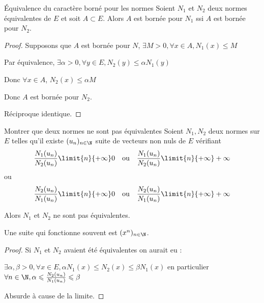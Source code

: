 \begin{proposition}{Équivalence du caractère borné pour les normes}{}
    Soient $N_1$ et $N_2$ deux normes équivalentes de $E$ et soit $A \subset E$. 
    Alors $A$ est bornée pour $N_1$ ssi $A$ est bornée pour $N_2$.
\end{proposition}


\begin{proof}
    Supposons que $A$ est bornée pour $N$, $\exists M > 0, \forall x \in A, N_1(x) \leqslant M$

    Par équivalence, $\exists \alpha > 0, \forall y \in E, N_2(y) \leqslant \alpha N_1(y)$

    Donc $\forall x \in A$, $N_2(x) \leqslant \alpha M$

    Donc $A$ est bornée pour $N_2$.

    Réciproque identique.
\end{proof}

\begin{proposition}{Montrer que deux normes ne sont pas équivalentes}{}
    Soient $N_1, N_2$ deux normes sur $E$ telles qu'il existe $(u_n)_{n \in \N}$ suite
    de vecteurs non nuls de $E$ vérifiant 
    \[\frac{N_1(u_n )}{N_2(u_n )} \limit{n}{+ \infty} 0 \quad \text{ou} \quad \frac{N_1(u_n )}{N_2(u_n )} \limit{n}{+ \infty} + \infty\]
    ou
    \[\frac{N_2(u_n )}{N_1(u_n )} \limit{n}{+ \infty} 0 \quad \text{ou} \quad \frac{N_2(u_n )}{N_1(u_n )} \limit{n}{+ \infty} + \infty\]

    Alors $N_1$ et $N_2$ ne sont pas équivalentes.
\end{proposition}

\begin{remarque}
    Une suite qui fonctionne souvent est $(x^n)_{n \in \N}$.
\end{remarque}


\begin{proof}
    Si $N_1$ et $N_2$ avaient été équivalentes on aurait eu :
    
    $\exists \alpha, \beta > 0, \forall x \in E, \alpha N_1(x) \leqslant N_2(x) \leqslant \beta N_1(x)$
    en particulier $\forall n \in \N, \alpha \leqslant \frac{N_2(u_n)}{N_1(u_n)} \leqslant \beta$

    Absurde à cause de la limite.
\end{proof}

